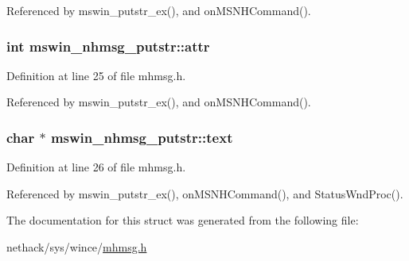 Referenced by mswin\+\_\+putstr\+\_\+ex(), and on\+M\+S\+N\+H\+Command().

\hypertarget{structmswin__nhmsg__putstr_aefa22819f8c3ca3574cfbcfd583ded58}{
\subsubsection[{attr}]{\setlength{\rightskip}{0pt plus 5cm}int mswin\+\_\+nhmsg\+\_\+putstr\+::attr}}\label{structmswin__nhmsg__putstr_aefa22819f8c3ca3574cfbcfd583ded58}


Definition at line 25 of file mhmsg.\+h.



Referenced by mswin\+\_\+putstr\+\_\+ex(), and on\+M\+S\+N\+H\+Command().

\hypertarget{structmswin__nhmsg__putstr_a27f09d7286c01fe17c1289761b63502e}{
\subsubsection[{text}]{ char $\ast$ mswin\+\_\+nhmsg\+\_\+putstr\+::text}}\label{structmswin__nhmsg__putstr_a27f09d7286c01fe17c1289761b63502e}


Definition at line 26 of file mhmsg.\+h.



Referenced by mswin\+\_\+putstr\+\_\+ex(), on\+M\+S\+N\+H\+Command(), and Status\+Wnd\+Proc().



The documentation for this struct was generated from the following file\+:\begin{DoxyCompactItemize}
\item 
nethack/sys/wince/\hyperlink{sys_2wince_2mhmsg_8h}{mhmsg.\+h}\end{DoxyCompactItemize}
